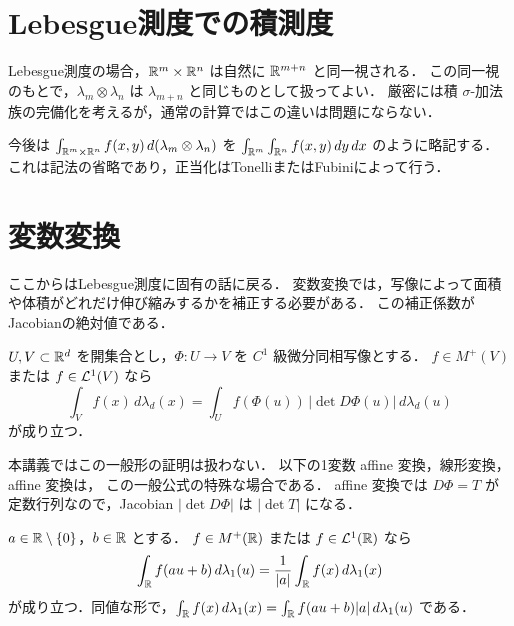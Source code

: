 \section{Lebesgue測度での積測度}

Lebesgue測度の場合，$\mathbb R^m\times\mathbb R^n$ は自然に $\mathbb R^{m+n}$ と同一視される．
この同一視のもとで，$\lambda_m\otimes\lambda_n$ は $\lambda_{m+n}$ と同じものとして扱ってよい．
厳密には積 $\sigma$-加法族の完備化を考えるが，通常の計算ではこの違いは問題にならない．

\begin{remark}
今後は $\int_{\mathbb R^m\times\mathbb R^n} f(x,y)\,d(\lambda_m\otimes\lambda_n)$ を
$\int_{\mathbb R^m}\int_{\mathbb R^n} f(x,y)\,dy\,dx$ のように略記する．
これは記法の省略であり，正当化はTonelliまたはFubiniによって行う．
\end{remark}

\section{変数変換}

ここからはLebesgue測度に固有の話に戻る．
変数変換では，写像によって面積や体積がどれだけ伸び縮みするかを補正する必要がある．
この補正係数がJacobianの絶対値である．

\begin{theorem}[一般の変数変換公式]\label{thm:change-of-variables-diffeomorphism}
$U,V\subset\mathbb R^d$ を開集合とし，$\Phi:U\to V$ を $C^1$ 級微分同相写像とする．
$f\in M^+(V)$ または $f\in\mathcal L^1(V)$ なら
\[
\int_V f(x)\,d\lambda_d(x)=\int_U f(\Phi(u))\,|\det D\Phi(u)|\,d\lambda_d(u)
\]
が成り立つ．
\end{theorem}

\begin{remark}
本講義ではこの一般形の証明は扱わない．
以下の1変数 affine 変換，線形変換，affine 変換は，
この一般公式の特殊な場合である．
affine 変換では $D\Phi=T$ が定数行列なので，Jacobian $|\det D\Phi|$ は $|\det T|$ になる．
\end{remark}

\begin{theorem}\label{thm:one-dimensional-affine-change-variables}
$a\in\mathbb R\setminus\{0\}$，$b\in\mathbb R$ とする．
$f\in M^+(\mathbb R)$ または $f\in\mathcal L^1(\mathbb R)$ なら
\[
\int_{\mathbb R} f(au+b)\,d\lambda_1(u)=\frac1{|a|}\int_{\mathbb R}f(x)\,d\lambda_1(x)
\]
が成り立つ．同値な形で，$\int_{\mathbb R} f(x)\,d\lambda_1(x)=\int_{\mathbb R} f(au+b)|a|\,d\lambda_1(u)$ である．
\end{theorem}

